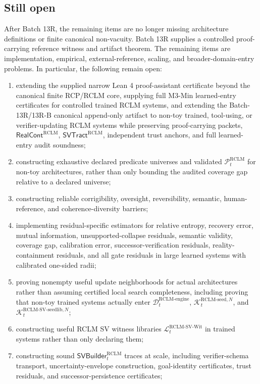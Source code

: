 \documentclass[11pt,a4paper]{article}
\newcommand{\Lcal}{\mathcal L}
\newcommand{\Pcal}{\mathcal P}
\newcommand{\Kcal}{\mathcal K}
\newcommand{\Dcal}{\mathcal D}
\newcommand{\RCLM}{\mathrm{RCLM}}
\newcommand{\engine}{\mathrm{engine}}
\begin{document}
\subsection{Still open}

After Batch 13R, the remaining items are no longer missing architecture definitions or finite canonical non-vacuity.  Batch 13R supplies a controlled proof-carrying reference witness and artifact theorem.  The remaining items are implementation, empirical, external-reference, scaling, and broader-domain-entry problems.  In particular, the following remain open:
\begin{enumerate}[leftmargin=1.5em]
    \item extending the supplied narrow Lean 4 proof-assistant certificate beyond the canonical finite RCP/RCLM core, supplying full M3-Min learned-entry certificates for controlled trained RCLM systems, and extending the Batch-13R/13R-B canonical append-only artifact to non-toy trained, tool-using, or verifier-updating RCLM systems while preserving proof-carrying packets, \(\mathsf{RealCont}^{\RCLM}\), \(\mathsf{SVTract}^{\RCLM}\), independent trust anchors, and full learned-entry audit soundness;
    \item constructing exhaustive declared predicate universes and validated \(\Pcal_t^{\RCLM}\) for non-toy architectures, rather than only bounding the audited coverage gap relative to a declared universe;
    \item constructing reliable corrigibility, oversight, reversibility, semantic, human-reference, and coherence-diversity barriers;
    \item implementing residual-specific estimators for relative entropy, recovery error, mutual information, unsupported-collapse residuals, semantic validity, coverage gap, calibration error, successor-verification residuals, reality-containment residuals, and all gate residuals in large learned systems with calibrated one-sided radii;
    \item proving nonempty useful update neighborhoods for actual architectures rather than assuming certified local search completeness, including proving that non-toy trained systems actually enter \(\Dcal_t^{\RCLM\text{-}\engine}\), \(\Kcal_t^{\RCLM\text{-}\mathrm{seed},N}\), and \(\Kcal_t^{\RCLM\text{-}\mathrm{SV\mbox{-}seedlib},N}\);
    \item constructing useful RCLM SV witness libraries \(\Lcal_t^{\RCLM\text{-}\mathrm{SV\mbox{-}Wit}}\) in trained systems rather than only declaring them;
    \item constructing sound \(\mathsf{SVBuilder}_t^{\RCLM}\) traces at scale, including verifier-schema transport, uncertainty-envelope construction, goal-identity certificates, trust residuals, and successor-persistence certificates;

\end{enumerate}
\end{document}
